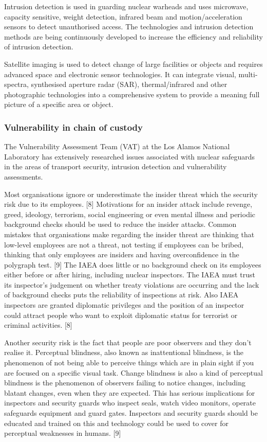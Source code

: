 \documentclass[twocolumn,a4paper]{article}
\begin{document}
Intrusion detection is used in guarding nuclear warheads and uses
microwave, capacity sensitive, weight detection, infrared beam and
motion/acceleration sensors to detect unauthorised access.  The
technologies and intrusion detection methods are being continuously
developed to increase the efficiency and reliability of intrusion
detection. \citep{wuwen2004}

Satellite imaging is used to detect change of large facilities or
objects and requires advanced space and electronic sensor
technologies. It can integrate visual, multi-spectra, synthesised
aperture radar (SAR), thermal/infrared and other photographic
technologies into a comprehensive system to provide a meaning full
picture of a specific area or object. \citep{wuwen2004}

\subsubsection{Vulnerability in chain of custody}
The Vulnerability Assessment Team (VAT) at the Los Alamos National
Laboratory has extensively researched issues associated with nuclear
safeguards in the areas of transport security, intrusion detection and
vulnerability assessments.

Most organisations ignore or underestimate the insider threat which
the security risk due to its employees. [8] Motivations for an insider
attack include revenge, greed, ideology, terrorism, social engineering
or even mental illness and periodic background checks should be used
to reduce the insider attacks. Common mistakes that organisations make
regarding the insider threat are thinking that low-level employees are
not a threat, not testing if employees can be bribed, thinking that
only employees are insiders and having overconfidence in the polygraph
test. [9] The IAEA does little or no background check on its employees
either before or after hiring, including nuclear inspectors. The IAEA
must trust its inspector’s judgement on whether treaty violations are
occurring and the lack of background checks puts the reliability of
inspections at risk. Also IAEA inspectors are granted diplomatic
privileges and the position of an inspector could attract people who
want to exploit diplomatic status for terrorist or criminal
activities. [8]

Another security risk is the fact that people are poor observers and
they don't realise it. Perceptual blindness, also known as
inattentional blindness, is the phenomenon of not being able to
perceive things which are in plain sight if you are focused on a
specific visual task. Change blindness is also a kind of perceptual
blindness is the phenomenon of observers failing to notice changes,
including blatant changes, even when they are expected. This has
serious implications for inspectors and security guards who inspect
seals, watch video monitors, operate safeguards equipment and guard
gates. Inspectors and security guards should be educated and trained
on this and technology could be used to cover for perceptual
weaknesses in humans. [9]
\end{document}
